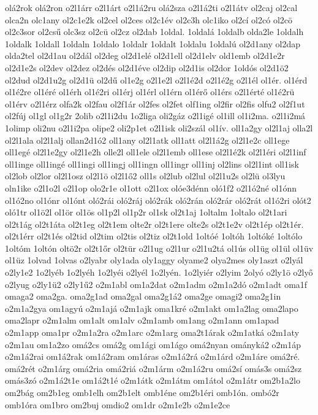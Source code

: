 {olá2rok
olá2ron
o2l1árr
o2l1árt
o2l1á2ru
olá2sza
o2l1á2ti
o2l1átv
ol2caj
ol2cal
olca2n
olc1any
ol2c1e2k
ol2cel
ol2ces
ol2c1év
ol2c3h
olc1iko
ol2cí
ol2có
ol2cö
ol2c3sor
ol2csű
olc3sz
ol2cü
ol2cz
ol2dab
1oldal.
1oldalá
1oldalb
olda2le
1oldalh
1oldalk
1oldall
1oldaln
1oldalo
1oldalr
1oldalt
1oldalu
1oldalú
ol2d1any
ol2dap
olda2tel
ol2d1au
ol2dál
ol2deg
ol2d1elé
ol2d1ell
ol2d1elv
old1emb
ol2d1e2r
ol2d1e2s
ol2dev
ol2dez
ol2dés
ol2d1éve
ol2dip
ol2d1is
ol2dor
1oldós
ol2d1ö2
ol2dud
ol2d1u2g
ol2d1ü
ol2dű
ol1e2g
o2l1e2l
o2l1é2d
o2l1é2g
o2l1él
ol1ér.
ol1érd
ol1é2re
ol1éré
ol1érh
ol1é2ri
ol1érj
ol1érl
ol1érn
ol1érő
ol1érs
o2l1érté
ol1é2rü
ol1érv
o2l1érz
olfa2k
ol2fau
ol2f1ár
ol2fes
ol2fet
olf1ing
ol2fir
ol2fis
olfu2
ol2f1ut
ol2fúj
ol1gl
ol1g2r
2olib
o2l1i2du
1o2liga
oli2gáz
o2l1igé
ol1ill
ol1i2ma.
o2l1i2má
1olimp
oli2nu
o2l1i2pa
olipe2
oli2p1et
o2l1isk
oli2szál
ol1ív.
oll1a2gy
ol2l1aj
olla2l
ol2l1ala
ol2l1alj
ollan2d1ó2
oll1any
ol2l1atk
oll1att
ol2l1á2g
ol2l1e2c
oll1ege
oll1egé
ol2l1e2gy
ol2l1e2h
olle2l
oll1ele
ol2l1emb
oll1ese
ol2l1é2k
ol2l1éri
ol2l1inf
oll1inge
oll1ingé
oll1ingi
oll1ingj
oll1ingn
oll1ingr
oll1inj
ol2lins
ol2l1int
oll1isk
ol2lob
ol2lor
ol2l1osz
ol2l1ö
ol2l1ő2
oll1s
ol2lub
ol2lul
ol2l1u2s
ol2lü
ol3lyu
oln1ike
o2l1o2l
o2l1op
olo2r1e
ol1ott
o2l1ox
olóe3dénn
oló1f2
o2l1ó2né
ol1ónn
ol1ó2no
ol1ónr
ol1ónt
oló2rái
oló2ráj
oló2rák
oló2rán
oló2rár
oló2rát
ol1ó2ri
olót2
oló1tr
ol1ö2l
ol1ör
ol1ös
ol1p2l
ol1p2r
ol1sk
ol2t1aj
1oltalm
1oltalo
ol2t1ari
ol2t1ág
ol2t1áta
ol2t1eg
ol2t1em
olte2r
ol2t1ere
olte2s
ol2t1e2v
ol2t1ép
ol2t1ér.
ol2t1érr
ol2t1és
ol2tid
ol2tim
ol2tis
ol2tiz
ol2t1old
1oltóé
1oltóh
1oltóké
1oltólo
1oltóm
1oltón
oltö2r
ol2t1őr
ol2tür
o2l1ug
o2l1ur
o2l1u2tá
ol1ús
ol1üg
ol1ül
ol1üv
ol1üz
1olvad
1olvas
o2lyabr
oly1ada
oly1aggy
olyame2
olya2mes
oly1aszt
o2lyál
o2ly1e2
1o2lyéb
1o2lyéh
1o2lyéi
o2lyél
1o2lyén.
1o2lyiér
o2lyim
2olyó
o2ly1ö
o2lyő
o2lyug
o2ly1ü2
o2ly1ű2
o2m1abl
om1a2dat
o2m1adm
o2m1a2dó
o2m1adt
oma1f
omaga2
oma2ga.
oma2g1ad
oma2gal
oma2g1á2
oma2ge
omagi2
oma2g1in
o2m1a2gya
om1agyú
o2m1ajá
o2m1ajk
oma1kré
o2m1akt
om1a2lag
oma2lapo
oma2lapr
o2m1alm
om1alt
om1alv
o2m1amb
om1ang
o2m1ann
om1apad
o2m1app
oma1pr
o2m1a2ra
o2m1arc
o2m1arg
oma2t1árak
o2m1atká
o2m1aty
o2m1au
om1a2zo
omá2cs
omá2g
om1ági
om1ágo
omá2nyan
ományká2
o2m1áp
o2m1á2rai
om1á2rak
om1á2ram
om1áras
o2m1á2rá
o2m1árd
o2m1áre
omá2ré.
omá2rét
o2m1árg
omá2ria
omá2riá
o2m1árm
o2m1á2ru
omá2sí
omás3s
omá2sz
omás3zó
o2m1á2t1e
om1á2t1é
o2m1átk
o2m1átm
om1átol
o2m1átr
om2b1a2lo
om2bág
om2b1eg
omb1elh
om2b1elt
omb1éne
om2b1éri
omb1ón.
ombó2r
omb1óra
om1bro
om2buj
omdio2
om1dr
o2m1e2b
o2m1e2ce
}
